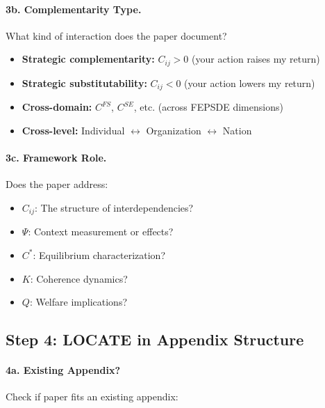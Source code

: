 \paragraph{3b. Complementarity Type.}
What kind of interaction does the paper document?

\begin{itemize}
  \item \textbf{Strategic complementarity:} $C_{ij} > 0$ (your action raises my return)
  \item \textbf{Strategic substitutability:} $C_{ij} < 0$ (your action lowers my return)
  \item \textbf{Cross-domain:} $C^{FS}$, $C^{SE}$, etc. (across FEPSDE dimensions)
  \item \textbf{Cross-level:} Individual $\leftrightarrow$ Organization $\leftrightarrow$ Nation
\end{itemize}

\paragraph{3c. Framework Role.}
Does the paper address:
\begin{itemize}
  \item $C_{ij}$: The structure of interdependencies?
  \item $\Psi$: Context measurement or effects?
  \item $C^*$: Equilibrium characterization?
  \item $K$: Coherence dynamics?
  \item $Q$: Welfare implications?
\end{itemize}

\subsection{Step 4: LOCATE in Appendix Structure}

\paragraph{4a. Existing Appendix?}
Check if paper fits an existing appendix:

